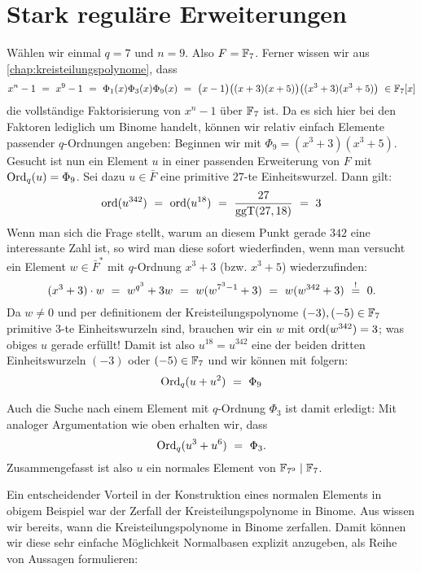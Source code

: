\section{Stark reguläre Erweiterungen}
\label{sec:stark_regulare_erweiterungen}

\begin{beispiel}
  \label{bsp:stark_regular_1}
  Wählen wir einmal $q = 7$ und $n=9$. Also $F = \mathbb{F}_7$.
  Ferner wissen wir aus \autoref{chap:kreisteilungspolynome}, dass
  \[ x^n-1 \ =\  x^9-1 \ =\  
    \Phi_1(x)\Phi_3(x)\Phi_9(x) \ =\ 
    \big(x-1\big)\big( (x+3)(x+5)\big)
    \big( (x^3+3)(x^3+5) \big) \ \in \mathbb{F}_7[x]\]
  die vollständige Faktorisierung von $x^n-1$ über $\mathbb{F}_7$ ist.
  Da es sich hier bei den Faktoren lediglich um Binome handelt, können wir
  relativ einfach Elemente passender $q$-Ordnungen angeben: Beginnen wir 
  mit $\Phi_9 = (x^3+3)(x^3+5)$. Gesucht ist nun ein Element $u$ in einer 
  passenden Erweiterung von $F$ mit $\operatorname{Ord}_q(u)= \Phi_9$.
  Sei dazu $u \in \bar F$ eine primitive $27$-te Einheitswurzel. Dann
  gilt:
  \[ \operatorname{ord}(u^{342}) \ =\  \operatorname{ord}(u^{18}) \ =\  \frac{27}{\operatorname{ggT}(27,18)} \ =\  3\]
  Wenn man sich die Frage stellt, warum an diesem Punkt gerade $342$ eine
  interessante Zahl ist, so wird man diese sofort wiederfinden, wenn man
  versucht ein Element $w\in \bar F^\ast$ mit $q$-Ordnung $x^3+3$ (bzw.
  $x^3+5$) wiederzufinden:
  \[ (x^3+3)\cdot w \ =\  w^{q^3} + 3 w \ =\  
    w(w^{7^3-1} +3) \ =\  w(w^{342}+3) \ \overset{!}{=}\  0.\]
  Da $w \neq 0$ und per definitionem der Kreisteilungspolynome 
  $(-3),(-5)\in \mathbb{F}_7$ primitive $3$-te Einheitswurzeln sind, 
  brauchen wir ein $w$ mit $\operatorname{ord}(w^{342}) = 3$; 
  was obiges $u$ gerade erfüllt! Damit ist also $u^{18} = u^{342}$ 
  eine der beiden dritten Einheitswurzeln $(-3)$ oder $(-5) \in \mathbb{F}_7$ und wir
  können mit  folgern:
  \[ \operatorname{Ord}_q(u + u^2) \ =\  \Phi_9\]

  Auch die Suche nach einem Element mit $q$-Ordnung $\Phi_3$ ist damit
  erledigt: Mit analoger Argumentation wie oben erhalten wir, dass 
  \[ \operatorname{Ord}_q(u^{3} + u^{6}) \ =\  \Phi_3.\]
  Zusammengefasst ist also $u$ ein normales Element von $\mathbb{F}_{7^9} \mid \mathbb{F}_7$.
\end{beispiel}

Ein entscheidender Vorteil in der Konstruktion eines normalen Elements in
obigem Beispiel war der Zerfall der Kreisteilungspolynome in Binome. Aus 
wissen wir bereits, wann die Kreisteilungspolynome in Binome zerfallen.
Damit können wir diese sehr einfache Möglichkeit Normalbasen explizit anzugeben,
als Reihe von Aussagen formulieren:

